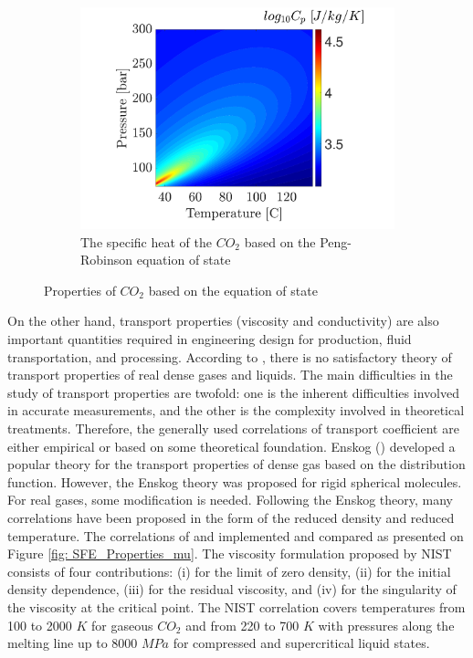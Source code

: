 \documentclass[../Article_Design_of_Experiment.tex]{subfiles}
\begin{document}
\begin{figure}[H]
			\hfill
			\begin{subfigure}[b]{0.95\textwidth}
				\centering
				\includegraphics[trim = 2.9cm 7cm 3.cm 7cm,clip,width=\textwidth]{Figures/CP.pdf}	
				\caption{The specific heat of the $CO_2$ based on the Peng-Robinson equation of state}
                \label{fig: SFE_Properties_CP}
			\end{subfigure}
			\caption{Properties of $CO_2$ based on the equation of state}
			\label{fig: SFE_Properties}
		\end{figure}    

        On the other hand, transport properties (viscosity and conductivity) are also important quantities required in engineering design for production, fluid transportation, and processing. According to \citet{Sheng1989}, there is no satisfactory theory of transport properties of real dense gases and liquids. The main difficulties in the study of transport properties are twofold: one is the inherent difficulties involved in accurate measurements, and the other is the complexity involved in theoretical treatments. Therefore, the generally used correlations of transport coefficient are either empirical or based on some theoretical foundation. Enskog () developed a popular theory for the transport properties of dense gas based on the distribution function. However, the Enskog theory was proposed for rigid spherical molecules. For real gases, some modification is needed. Following the Enskog theory, many correlations have been proposed in the form of the reduced density and reduced temperature. The correlations of \citet{Fenghour1998} and \citet{Laesecke2017} implemented and compared as presented on Figure \ref{fig: SFE_Properties_mu}. The viscosity formulation proposed by NIST consists of four contributions: (i) for the limit of zero density, (ii) for the initial density dependence, (iii) for the residual viscosity, and (iv) for the singularity of the viscosity at the critical point. The NIST correlation covers temperatures from 100 to 2000 $K$ for gaseous $CO_2$ and from 220 to 700 $K$ with pressures along the melting line up to 8000 $MPa$ for compressed and supercritical liquid states. 
			
\end{document}

